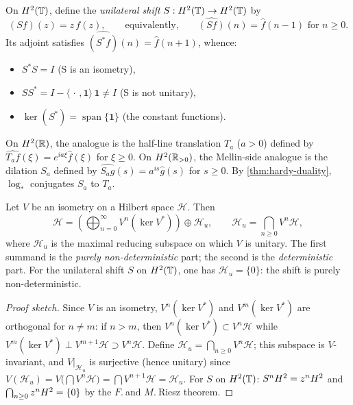 \begin{definition}\label{def:shift}
On $H^2(\mathbb{T})$, define the \emph{unilateral shift} $S : H^2(\mathbb{T}) \to H^2(\mathbb{T})$ by
\begin{equation}\label{eq:shift}
(Sf)(z) = z\, f(z), \qquad \text{equivalently,} \qquad \widehat{(Sf)}(n) = \widehat{f}(n-1) \text{ for } n \geq 0.
\end{equation}
Its adjoint satisfies $\widehat{(S^*f)}(n) = \widehat{f}(n+1)$, whence:
\begin{itemize}
\item $S^*S = I$ \quad (S is an isometry),
\item $SS^* = I - \langle \,\cdot\,, \mathbf{1}\rangle\, \mathbf{1} \neq I$ \quad (S is not unitary),
\item $\ker(S^*) = \operatorname{span}\{\mathbf{1}\}$ \quad (the constant functions).
\end{itemize}
On $H^2(\mathbb{R})$, the analogue is the half-line translation $T_a$ ($a > 0$) defined by $\widehat{T_a f}(\xi) = e^{ia\xi}\widehat{f}(\xi)$ for $\xi \geq 0$. On $H^2(\mathbb{R}_{>0})$, the Mellin-side analogue is the dilation $S_a$ defined by $\widehat{S_a g}(s) = a^{is}\widehat{g}(s)$ for $s \geq 0$. By \cref{thm:hardy-duality}, $\log_*$ conjugates $S_a$ to $T_a$.
\end{definition}

\begin{theorem}\label{thm:wold}
Let $V$ be an isometry on a Hilbert space $\mathcal{H}$. Then
\begin{equation}\label{eq:wold}
\mathcal{H} = \left(\bigoplus_{n=0}^{\infty} V^n(\ker V^*)\right) \oplus \mathcal{H}_u, \qquad \mathcal{H}_u = \bigcap_{n \geq 0} V^n \mathcal{H},
\end{equation}
where $\mathcal{H}_u$ is the maximal reducing subspace on which $V$ is unitary. The first summand is the \emph{purely non-deterministic} part; the second is the \emph{deterministic} part. For the unilateral shift $S$ on $H^2(\mathbb{T})$, one has $\mathcal{H}_u = \{0\}$: the shift is purely non-deterministic.
\end{theorem}

\begin{proof}[Proof sketch]
Since $V$ is an isometry, $V^n(\ker V^*)$ and $V^m(\ker V^*)$ are orthogonal for $n \neq m$: if $n > m$, then $V^n(\ker V^*) \subset V^{n}\mathcal{H}$ while $V^m(\ker V^*) \perp V^{m+1}\mathcal{H} \supset V^n\mathcal{H}$. Define $\mathcal{H}_u = \bigcap_{n \geq 0} V^n\mathcal{H}$; this subspace is $V$-invariant, and $V|_{\mathcal{H}_u}$ is surjective (hence unitary) since $V(\mathcal{H}_u) = V\bigl(\bigcap V^n\mathcal{H}\bigr) = \bigcap V^{n+1}\mathcal{H} = \mathcal{H}_u$. For $S$ on $H^2(\mathbb{T})$: $S^nH^2 = z^nH^2$ and $\bigcap_{n \geq 0} z^nH^2 = \{0\}$ by the $F.\ $and $M.\ $Riesz theorem.
\end{proof}

